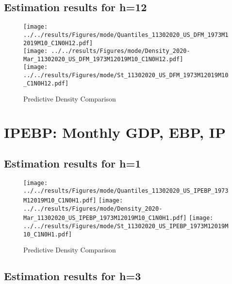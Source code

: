 \documentclass[12pt]{article}
\numberwithin{table}{subsection}
\numberwithin{figure}{section}
\begin{document}
\clearpage
\subsection{Estimation results for h=12}

\begin{figure}[htb!]
	\caption{Predictive Density Comparison}
	\centering
	\texttt{[image: ../../results/Figures/mode/Quantiles\_11302020\_US\_DFM\_1973M12019M10\_C1N0H12.pdf]}\\
	\texttt{[image: ../../results/Figures/mode/Density\_2020-Mar\_11302020\_US\_DFM\_1973M12019M10\_C1N0H12.pdf]}\\
	\texttt{[image: ../../results/Figures/mode/St\_11302020\_US\_DFM\_1973M12019M10\_C1N0H12.pdf]}\\
\end{figure}


\clearpage
\section{IPEBP: Monthly GDP, EBP, IP}
\subsection{Estimation results for h=1}

\begin{figure}[htb!]
	\caption{Predictive Density Comparison}
	\centering
	\texttt{[image: ../../results/Figures/mode/Quantiles\_11302020\_US\_IPEBP\_1973M12019M10\_C1N0H1.pdf]}
	\texttt{[image: ../../results/Figures/mode/Density\_2020-Mar\_11302020\_US\_IPEBP\_1973M12019M10\_C1N0H1.pdf]}
	\texttt{[image: ../../results/Figures/mode/St\_11302020\_US\_IPEBP\_1973M12019M10\_C1N0H1.pdf]}
\end{figure}


\clearpage
\subsection{Estimation results for h=3}
\end{document}
